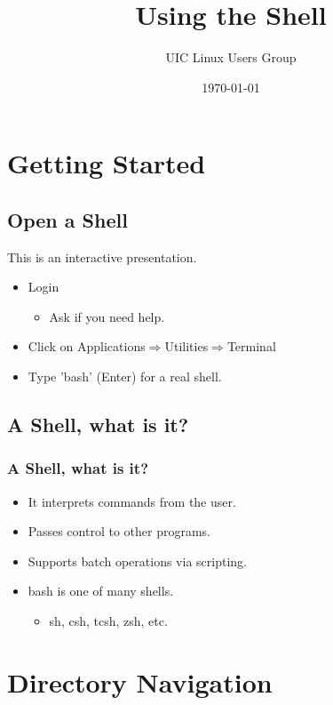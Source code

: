 \documentclass[hyperref={pdfpagelabels=false}]{beamer}
\title{Using the Shell}
\author{UIC Linux Users Group}
\date{\today}
\begin{document}
\frame{\titlepage}
\section{Getting Started}
\subsection{Open a Shell}
\frame
{
    This is an interactive presentation.
    \begin{itemize}
    \item{Login}
        \begin{itemize}
        \item{Ask if you need help.}
        \end{itemize}
    \item{ Click on Applications$\Rightarrow$Utilities$\Rightarrow$Terminal}
    \item{ Type 'bash' (Enter) for a real shell.}
    \end{itemize}
   
}
\subsection{A Shell, what is it?}
\frame
{
    \frametitle{A Shell, what is it?}
    \begin{itemize}
    \item{It interprets commands from the user.}
    \item{Passes control to other programs.}
    \item{Supports batch operations via scripting.}
    \item{bash is one of many shells.}
        \begin{itemize}
        \item{sh, csh, tcsh, zsh, etc.}
        \end{itemize}
    \end{itemize}
}
\section{Directory Navigation}
\end{document}
